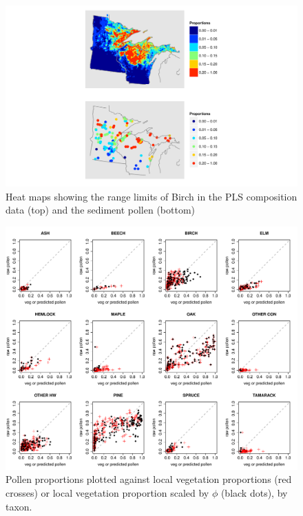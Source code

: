 \begin{figure}
\centering
\includegraphics[width=7in]{figures/maps_compare_BIRCH.pdf}
\caption{Heat maps showing the range limits of Birch in the PLS composition data (top) and the sediment pollen (bottom)}
\label{fig:compare_maps_BIRCH}
\end{figure}

\begin{figure}
\centering
\includegraphics[width=7in]{figures/pollen_focal_scaled.pdf}
\caption{Pollen proportions plotted against local vegetation proportions (red crosses) or local vegetation proportion scaled by $\phi$ (black dots), by taxon.}
\label{fig:focal_scaled}
\end{figure}

